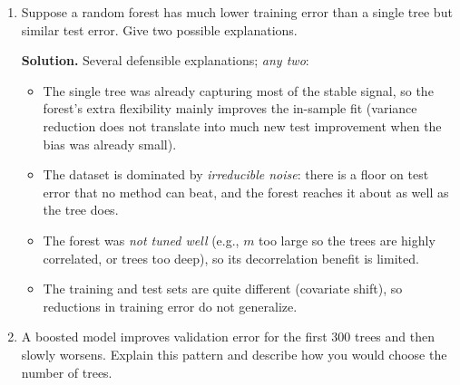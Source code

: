 \documentclass[11pt]{article}
\newcommand{\solution}[1]{%
  \par\medskip\noindent\textbf{Solution.} #1\par\medskip
}
\begin{document}
\begin{enumerate}[leftmargin=*]
\solution{The colleague is roughly right when (i) the sample is so large that even a single split leaves both train and test sets individually huge, so the test estimate has tiny variance, and (ii) you are not making many adaptive modeling decisions. In that case CV mostly buys compute time.\\
You would still use $k$-fold CV when:
\begin{itemize}
\item the model is sensitive to which observations are in the training set (rare events, natural groups, time series),
\item you are comparing many candidate models and want tight error bars to separate close competitors (single-split error has higher variance),
\item you need to tune hyperparameters on something other than the final test set,
\item the model is cheap to refit, so CV is essentially free.
\end{itemize}
``Big data'' does not erase the value of repeated estimates of test error.}

\item Suppose a random forest has much lower training error than a single tree but similar test error. Give two possible explanations.

\solution{Several defensible explanations; \emph{any two}:
\begin{itemize}
\item The single tree was already capturing most of the stable signal, so the forest's extra flexibility mainly improves the in-sample fit (variance reduction does not translate into much new test improvement when the bias was already small).
\item The dataset is dominated by \emph{irreducible noise}: there is a floor on test error that no method can beat, and the forest reaches it about as well as the tree does.
\item The forest was \emph{not tuned well} (e.g., $m$ too large so the trees are highly correlated, or trees too deep), so its decorrelation benefit is limited.
\item The training and test sets are quite different (covariate shift), so reductions in training error do not generalize.
\end{itemize}}

\item A boosted model improves validation error for the first 300 trees and then slowly worsens. Explain this pattern and describe how you would choose the number of trees.


\end{enumerate}
\end{document}
